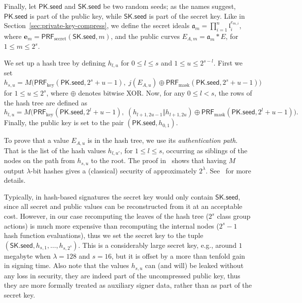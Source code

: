 \documentclass{llncs}
\newcommand{\seed}{\mathsf{seed}}
\newcommand{\PK}{\mathsf{PK}}
\newcommand{\SK}{\mathsf{SK}}
\renewcommand{\a}{\mathfrak{a}}
\renewcommand{\l}{\mathfrak{l}}
\newcommand{\e}{\mathbf{e}}
\newcommand{\PRF}{\mathsf{PRF}}
\newcommand{\PRFk}{\PRF_{\mathrm{key}}}
\newcommand{\PRFm}{\PRF_{\mathrm{mask}}}
\newcommand{\PRFs}{\PRF_{\mathrm{secret}}}
\begin{document}
Finally, let $\PK.\seed$ and $\SK.\seed$ be two random seeds; as the names suggest, $\PK.\seed$ is part of the public key, while $\SK.\seed$ is part of the secret key.
Like in Section~\ref{sec:private-key-compress}, we define the secret ideals $\a_m = \prod_{i=1}^n \l_i^{e_{m,i}}$, where $\e_m=\PRFs(\SK.\seed, m)$, and the public curves $E_{A,m}=\a_m*E$, for $1\le m\le 2^s$.

We set up a hash tree by defining $h_{l,u}$ for $0 \le l \le s$ and $1 \le u \le 2^{s-l}$.
First we set
\[h_{s,u} = M\bigl( \PRFk(\PK.\seed,2^s+u-1),\; j( E_{A,u} ) \oplus \PRFm(\PK.\seed,2^s+u-1) \bigr)\]
for $1 \le u \le 2^s$, where $\oplus$ denotes bitwise XOR.
Now, for any $0 \le l < s$, the rows of the hash tree are defined as
\[
  h_{l,u} = M\bigl( \PRFk(\PK.\seed, 2^l+u-1),\;
  (h_{l+1,2u-1}\Vert h_{l+1,2u}) \oplus \PRFm(\PK.\seed, 2^l+u-1) \bigr).
\]
Finally, the public key is set to the pair $(\PK.\seed, h_{0,1})$.

To prove that a value $E_{A,u}$ is in the hash tree, we use its \emph{authentication path}.
That is the list of the hash values $h_{l,u'}$, for $1\le l \le s$, occurring as siblings of the nodes on the path from $h_{s,u}$ to the root.
The proof in~\cite[Appendix~B]{10.1007/978-3-662-49384-7_15} shows that having $M$ output $\lambda$-bit hashes gives a (classical) security of approximately $2^\lambda$.
See~\cite{10.1007/978-3-662-49384-7_15,sphincs+} for more details.

Typically, in hash-based signatures the secret key would only contain $\SK.\seed$, since all secret and public values can be reconstructed from it at an acceptable cost.
However, in our case recomputing the leaves of the hash tree ($2^s$ class group actions) is much more expensive than recomputing the internal nodes ($2^s-1$ hash function evaluations), thus we set the secret key to the tuple $(\SK.\seed,h_{s,1},\dots,h_{s,2^s})$.
This is a considerably large secret key, e.g., around $1$ megabyte when $\lambda=128$ and $s=16$, but it is offset by a more than tenfold gain in signing time.
Also note that the values $h_{s,u}$ can (and will) be leaked without any loss in security, they are indeed part of the uncompressed public key, thus they are more formally treated as auxiliary signer data, rather than as part of the secret key.
\end{document}
